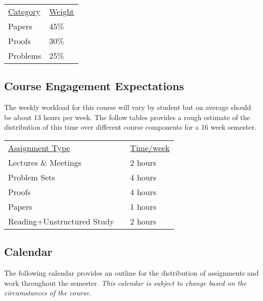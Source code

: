 \documentclass[nobib]{tufte-handout}
\begin{document}
\begin{center}
  \begin{tabular}{ll}
  \underline{Category} & \underline{Weight} \\
    Papers & 45\% \\ %
    Proofs & 30\% \\ %
    Problems & 25\% \\ %
  \end{tabular}
\end{center}


\subsection{Course Engagement Expectations}

The weekly workload for this course will vary by student but on average should be about 13 hours per week.  The follow tables provides a rough estimate of the distribution of this time over different course components for a 16 week semester.
\begin{center}
\begin{tabular}{lll}
\underline{Assignment Type} &  & \underline{Time/week} \\
Lectures \& Meetings &      & 2 hours \\
Problem Sets &    & 4 hours \\
Proofs &   & 4 hours \\
Papers &  & 1 hours \\
Reading+Unstructured Study & & 2 hours \\
\end{tabular}
\end{center}


\subsection{Calendar}

The following calendar provides an outline for the distribution of assignments and work throughout the semester.  \textit{This calendar is subject to change based on the circumstances of the course.}
\end{document}
